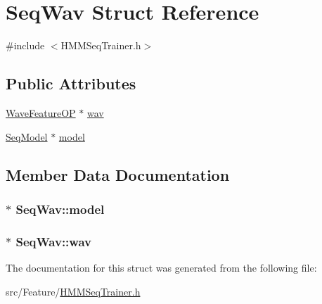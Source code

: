 \hypertarget{struct_seq_wav}{\section{Seq\+Wav Struct Reference}
\label{struct_seq_wav}
}


{\ttfamily \#include $<$H\+M\+M\+Seq\+Trainer.\+h$>$}

\subsection*{Public Attributes}
\begin{DoxyCompactItemize}
\item 
\hyperlink{class_wave_feature_o_p}{Wave\+Feature\+O\+P} $\ast$ \hyperlink{struct_seq_wav_a9b018d01a695b36548c8e2239d4dfbae}{wav}
\item 
\hyperlink{class_seq_model}{Seq\+Model} $\ast$ \hyperlink{struct_seq_wav_af7a3759e19503324fea9fb311a39a9ae}{model}
\end{DoxyCompactItemize}


\subsection{Member Data Documentation}
\hypertarget{struct_seq_wav_af7a3759e19503324fea9fb311a39a9ae}{
\subsubsection[{model}]{$\ast$ Seq\+Wav\+::model}}\label{struct_seq_wav_af7a3759e19503324fea9fb311a39a9ae}
\hypertarget{struct_seq_wav_a9b018d01a695b36548c8e2239d4dfbae}{
\subsubsection[{wav}]{$\ast$ Seq\+Wav\+::wav}}\label{struct_seq_wav_a9b018d01a695b36548c8e2239d4dfbae}


The documentation for this struct was generated from the following file\+:\begin{DoxyCompactItemize}
\item 
src/\+Feature/\hyperlink{_h_m_m_seq_trainer_8h}{H\+M\+M\+Seq\+Trainer.\+h}\end{DoxyCompactItemize}
